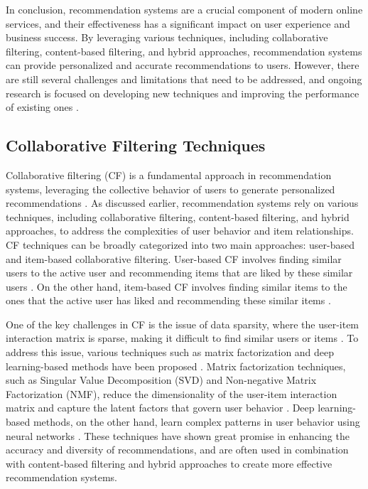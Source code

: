 \documentclass[11pt,a4paper]{article}
\begin{document}
In conclusion, recommendation systems are a crucial component of modern online services, and their effectiveness has a significant impact on user experience and business success. By leveraging various techniques, including collaborative filtering, content-based filtering, and hybrid approaches, recommendation systems can provide personalized and accurate recommendations to users. However, there are still several challenges and limitations that need to be addressed, and ongoing research is focused on developing new techniques and improving the performance of existing ones \cite{doi:10.1109/tpami.2024.3371473}.


\subsection{Collaborative Filtering Techniques}


Collaborative filtering (CF) is a fundamental approach in recommendation systems, leveraging the collective behavior of users to generate personalized recommendations \cite{doi:10.1155/2009/421425}. As discussed earlier, recommendation systems rely on various techniques, including collaborative filtering, content-based filtering, and hybrid approaches, to address the complexities of user behavior and item relationships. CF techniques can be broadly categorized into two main approaches: user-based and item-based collaborative filtering. User-based CF involves finding similar users to the active user and recommending items that are liked by these similar users \cite{doi:10.1209/0295-5075/82/58007}. On the other hand, item-based CF involves finding similar items to the ones that the active user has liked and recommending these similar items \cite{doi:10.1214/09-aos759}.

One of the key challenges in CF is the issue of data sparsity, where the user-item interaction matrix is sparse, making it difficult to find similar users or items \cite{doi:10.4028/www.scientific.net/amm.201-202.428}. To address this issue, various techniques such as matrix factorization and deep learning-based methods have been proposed \cite{arxiv:1707.07435}. Matrix factorization techniques, such as Singular Value Decomposition (SVD) and Non-negative Matrix Factorization (NMF), reduce the dimensionality of the user-item interaction matrix and capture the latent factors that govern user behavior \cite{doi:10.1073/pnas.1000488107}. Deep learning-based methods, on the other hand, learn complex patterns in user behavior using neural networks \cite{arxiv:1608.07400}. These techniques have shown great promise in enhancing the accuracy and diversity of recommendations, and are often used in combination with content-based filtering and hybrid approaches to create more effective recommendation systems.
\end{document}
